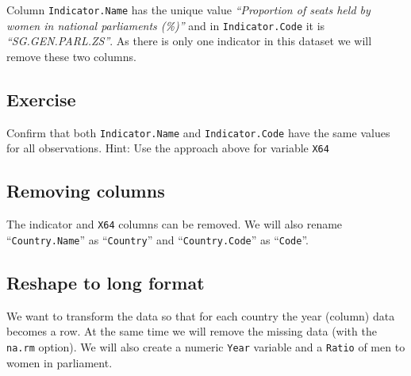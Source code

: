 \documentclass[a4paper,9pt,twocolumn,twoside,printwatermark=false]{pinp}
\begin{document}
Column \texttt{Indicator.Name} has the unique value \emph{``Proportion
of seats held by women in national parliaments (\%)''} and in
\texttt{Indicator.Code} it is \emph{``SG.GEN.PARL.ZS''}. As there is
only one indicator in this dataset we will remove these two columns.

\subsection{Exercise}\label{exercise-2}

Confirm that both \texttt{Indicator.Name} and \texttt{Indicator.Code}
have the same values for all observations. Hint: Use the approach above
for variable \texttt{X64}

\subsection{Removing columns}\label{removing-columns}

The indicator and \texttt{X64} columns can be removed. We will also
rename ``\texttt{Country.Name}'' as ``\texttt{Country}'' and
``\texttt{Country.Code}'' as ``\texttt{Code}''.

\begin{Shaded}
\end{Shaded}

\subsection{Reshape to long format}\label{reshape-to-long-format}

We want to transform the data so that for each country the year (column)
data becomes a row. At the same time we will remove the missing data
(with the \texttt{na.rm} option). We will also create a numeric
\texttt{Year} variable and a \texttt{Ratio} of men to women in
parliament.
\end{document}
